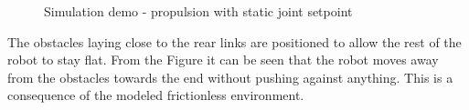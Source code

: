 \begin{figure}[H]
    \hfil

    \caption{Simulation demo - propulsion with static joint setpoint}
    \label{fig:case2-1}
\end{figure}

The obstacles laying close to the rear links are positioned to allow the rest of the robot to stay flat. From the Figure it can be seen that the robot moves away from the obstacles towards the end without pushing against anything. This is a consequence of the modeled frictionless environment.

